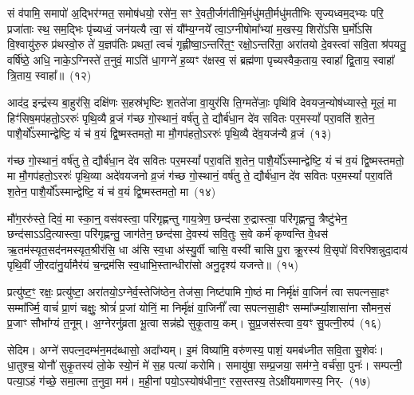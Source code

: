 सं व॑पामि॒ समापो॑ अ॒द्भिर॑ग्मत॒ समोष॑धयो॒ रसे॑न॒ सꣳ रे॒वती॒र्जग॑तीभि॒र्मधु॑मती॒र्मधु॑\-मतीभिः सृज्यध्वम॒द्भ्यः परि॒ प्रजा॑ताः स्थ॒ सम॒द्भिः पृ॑च्यध्वं॒ जन॑यत्यै त्वा॒ सं यौ᳚म्य॒ग्नये᳚ त्वा॒\-ऽग्नी\-षोमा᳚भ्यां म॒खस्य॒ शिरो॑\-ऽसि घ॒र्मो॑\-ऽसि वि॒श्वायु॑रु॒रु प्र॑थस्वो॒रु ते॑ य॒ज्ञप॑तिः प्रथतां॒ त्वचं॑ गृह्णीष्वा॒\-ऽन्तरि॑त॒ꣳ॒ रक्षो॒\-ऽन्तरि॑ता॒ अरा॑तयो दे॒वस्त्वा॑ सवि॒ता श्र॑पयतु॒ वर्\mbox{}षि॑ष्ठे॒ अधि॒ नाके॒\-ऽग्निस्ते॑ त॒नुवं॒ मा\-ऽति॑ धा॒गग्ने॑ ह॒व्यꣳ र॑क्षस्व॒ सं ब्रह्म॑णा पृच्यस्वैक॒ताय॒ स्वाहा᳚ द्वि॒ताय॒ स्वाहा᳚ त्रि॒ताय॒ स्वाहा᳚॥~(१२)

{\anuvakamend[{स॒वि॒ता द्वाविꣳ॑शतिश्च}]}

आद॑द॒ इन्द्र॑स्य बा॒हुर॑सि॒ दक्षि॑णः स॒हस्र॑भृष्टिः श॒तते॑जा वा॒युर॑सि ति॒ग्मते॑जाः॒ पृथि॑वि देवयज॒न्योष॑ध्यास्ते॒ मूलं॒ मा हिꣳ॑सिष॒मप॑हतो॒\-ऽररुः॑ पृथि॒व्यै व्र॒जं ग॑च्छ गो॒स्थानं॒ वर्\mbox{}ष॑तु ते॒ द्यौर्ब॑धा॒न दे॑व सवितः पर॒मस्यां᳚ परा॒वति॑ श॒तेन॒ पाशै॒र्यो᳚\-ऽस्मान्द्वेष्टि॒ यं च॑ व॒यं द्वि॒ष्मस्तमतो॒ मा मौ॒गप॑हतो॒\-ऽररुः॑ पृथि॒व्यै दे॑व॒यज॑न्यै व्र॒जं~(१३)

ग॑च्छ गो॒स्थानं॒ वर्\mbox{}ष॑तु ते॒ द्यौर्ब॑धा॒न दे॑व सवितः पर॒मस्यां᳚ परा॒वति॑ श॒तेन॒ पाशै॒र्यो᳚\-ऽस्मान्द्वेष्टि॒ यं च॑ व॒यं द्वि॒ष्मस्तमतो॒ मा मौ॒गप॑हतो॒\-ऽररुः॑ पृथि॒व्या अदे॑वयजनो व्र॒जं ग॑च्छ गो॒स्थानं॒ वर्\mbox{}ष॑तु ते॒ द्यौर्ब॑धा॒न दे॑व सवितः पर॒मस्यां᳚ परा॒वति॑ श॒तेन॒ पाशै॒र्यो᳚\-ऽस्मान्द्वेष्टि॒ यं च॑ व॒यं द्वि॒ष्मस्तमतो॒ मा~(१४)

मौ॑ग॒ररु॑स्ते॒ दिवं॒ मा स्का॒न्॒ वस॑वस्त्वा॒ परि॑गृह्णन्तु गाय॒त्रेण॒ छन्द॑सा रु॒द्रास्त्वा॒ परि॑गृह्णन्तु॒ त्रैष्टु॑भेन॒ छन्द॑सा\-ऽऽ\-दि॒त्यास्त्वा॒ परि॑गृह्णन्तु॒ जाग॑तेन॒ छन्द॑सा दे॒वस्य॑ सवि॒तुः स॒वे कर्म॑ कृण्वन्ति वे॒धस॑ ऋ॒तम॑स्यृत॒सद॑नमस्यृत॒श्रीर॑सि॒ धा अ॑सि स्व॒धा अ॑स्यु॒र्वी चासि॒ वस्वी॑ चासि पु॒रा क्रू॒रस्य॑ वि॒सृपो॑ विरफ्शिन्नुदा॒दाय॑ पृथि॒वीं जी॒रदा॑नु॒र्यामैर॑यं च॒न्द्रम॑सि स्व॒धाभि॒स्तान्धीरा॑सो अनु॒दृश्य॑ यजन्ते॥~(१५)

{\anuvakamend[{दे॒व॒यज॑न्यै व्र॒जन्तमतो॒ मा वि॑रफ्शि॒न्नेका॑\-दश च}]}

प्रत्यु॑ष्ट॒ꣳ॒ रक्षः॒ प्रत्यु॑ष्टा॒ अरा॑तयो॒\-ऽग्नेर्व॒स्तेजि॑ष्ठेन॒ तेज॑सा॒ निष्ट॑पामि गो॒ष्ठं मा निर्मृ॑क्षं वा॒जिनं॑ त्वा सपत्नसा॒हꣳ सम्मा᳚र्ज्मि॒ वाचं॑ प्रा॒णं चक्षुः॒ श्रोत्रं॑ प्र॒जां योनिं॒ मा निर्मृ॑क्षं वा॒जिनीं᳚ त्वा सपत्नसा॒हीꣳ सम्मा᳚र्ज्म्या॒शासा॑ना सौमन॒सं प्र॒जाꣳ सौभा᳚ग्यं त॒नूम्। अ॒ग्नेरनु॑व्रता भू॒त्वा सन्न॑ह्ये सुकृ॒ताय॒ कम्। सु॒प्र॒जस॑स्त्वा व॒यꣳ सु॒पत्नी॒रुप॑~(१६)

सेदिम। अग्ने॑ सपत्न॒दम्भ॑न॒मद॑ब्धासो॒ अदा᳚भ्यम्। इ॒मं विष्या॑मि॒ वरु॑णस्य॒ पाशं॒ यमब॑ध्नीत सवि॒ता सु॒शेवः॑। धा॒तुश्च॒ योनौ॑ सुकृ॒तस्य॑ लो॒के स्यो॒नं मे॑ स॒ह पत्या॑ करोमि। समायु॑षा॒ सम्प्र॒जया॒ सम॑ग्ने॒ वर्च॑सा॒ पुनः॑। सम्पत्नी॒ पत्या॒\-ऽहं ग॑च्छे॒ समा॒त्मा त॒नुवा॒ मम॑। म॒ही॒नां पयो॒\-ऽस्योष॑धीना॒ꣳ॒ रस॒स्तस्य॒ ते\-ऽक्षी॑यमाणस्य॒ निर्-~(१७)


